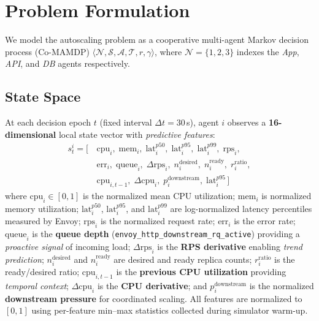\documentclass[conference]{IEEEtran}
\begin{document}
\section{Problem Formulation}
\label{sec:formulation}

We model the autoscaling problem as a cooperative multi-agent Markov
decision process (Co-MAMDP)
$\langle \mathcal{N}, \mathcal{S}, \mathcal{A}, \mathcal{T},
r, \gamma \rangle$,
where $\mathcal{N} = \{1,2,3\}$ indexes the \emph{App}, \emph{API},
and \emph{DB} agents respectively.

\subsection{State Space}

At each decision epoch $t$ (fixed interval $\Delta t = 30$\,s),
agent $i$ observes a \textbf{16-dimensional} local state vector with
\emph{predictive features}:
\begin{equation}
\begin{aligned}
s_t^i = [\,&\mathrm{cpu}_i,\;\mathrm{mem}_i,\;\mathrm{lat}^{p50}_i,\;\mathrm{lat}^{p95}_i,\;\mathrm{lat}^{p99}_i,\;\mathrm{rps}_i,\\
&\mathrm{err}_i,\;\mathrm{queue}_i,\;\Delta\mathrm{rps}_i,\;n_i^{\mathrm{desired}},\;n_i^{\mathrm{ready}},\;r_i^{\mathrm{ratio}},\\
&\mathrm{cpu}_{i,t-1},\;\Delta\mathrm{cpu}_i,\;p_i^{\mathrm{downstream}},\;\mathrm{lat}^{p95}_i\,]
\end{aligned}
\label{eq:state}
\end{equation}
where $\mathrm{cpu}_i \!\in\! [0,1]$ is the normalized mean CPU
utilization; $\mathrm{mem}_i$ is normalized memory utilization;
$\mathrm{lat}^{p50}_i$, $\mathrm{lat}^{p95}_i$, and
$\mathrm{lat}^{p99}_i$ are log-normalized latency percentiles measured
by Envoy; $\mathrm{rps}_i$ is the normalized request rate;
$\mathrm{err}_i$ is the error rate; $\mathrm{queue}_i$ is the
\textbf{queue depth} (\texttt{envoy\_http\_downstream\_rq\_active})
providing a \emph{proactive signal} of incoming load;
$\Delta\mathrm{rps}_i$ is the \textbf{RPS derivative} enabling
\emph{trend prediction}; $n_i^{\mathrm{desired}}$ and
$n_i^{\mathrm{ready}}$ are desired and ready replica counts;
$r_i^{\mathrm{ratio}}$ is the ready/desired ratio;
$\mathrm{cpu}_{i,t-1}$ is the \textbf{previous CPU utilization}
providing \emph{temporal context}; $\Delta\mathrm{cpu}_i$ is the
\textbf{CPU derivative}; and $p_i^{\mathrm{downstream}}$ is the
normalized \textbf{downstream pressure} for coordinated scaling. All
features are normalized to $[0,1]$ using per-feature min--max
statistics collected during simulator warm-up.
\end{document}
